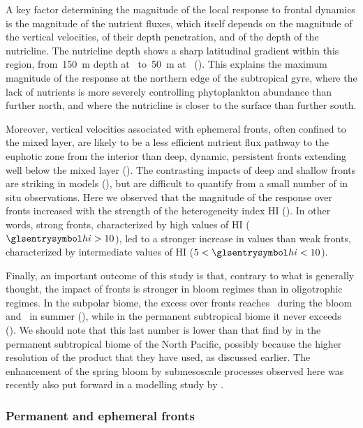 A key factor determining the magnitude of the local  response to frontal dynamics is the magnitude of the nutrient fluxes, which itself depends on the magnitude of the vertical velocities, of their depth penetration, and of the depth of the nutricline.
The nutricline depth shows a sharp latitudinal gradient within this region, from~\qty{150}{\m} depth at~ to~\qty{50}{\m} at~ (\cite{romera-castillo_2016}).
This explains the maximum magnitude of the  response at the northern edge of the subtropical gyre, where the lack of nutrients is more severely controlling phytoplankton abundance than further north, and where the nutricline is closer to the surface than further south.

Moreover, vertical velocities associated with ephemeral fronts, often confined to the mixed layer, are likely to be a less efficient nutrient flux pathway to the euphotic zone from the interior than deep, dynamic, persistent fronts extending well below the mixed layer (\cite{levy_2018}).
The contrasting impacts of deep and shallow fronts are striking in models (\cite{levy_2012}), but are difficult to quantify from a small number of in situ observations.
Here we observed that the magnitude of the  response over fronts increased with the strength of the heterogeneity index HI ().
In other words, strong fronts, characterized by high values of HI (\(\am{hi} > 10\)), led to a stronger increase in  values than weak fronts, characterized by intermediate values of HI (\(5 < \am{hi} < 10\)).

Finally, an important outcome of this study is that, contrary to what is generally thought, the impact of fronts is stronger in bloom regimes than in oligotrophic regimes.
In the subpolar biome, the   excess over fronts reaches~ during the bloom and~ in summer (), while in the permanent subtropical biome it never exceeds~ ().
We should note that this last number is lower than that find by \textcite{liu_2016} in the permanent subtropical biome of the North Pacific, possibly because the higher resolution of the product that they have used, as discussed earlier.
The enhancement of the spring bloom by submesoscale processes observed here was recently also put forward in a modelling study by \textcite{simoes-sousa_2022}.

\subsubsection{Permanent and ephemeral fronts}

